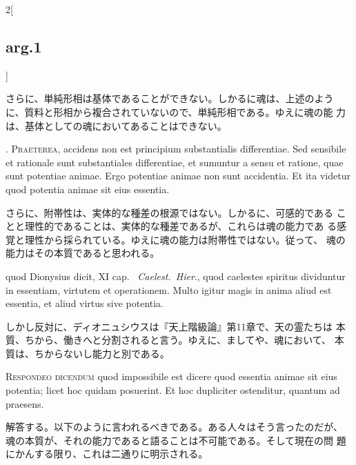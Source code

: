 \documentclass[paper=a4paper,fontsize=10pt,jafontsize=9pt,titlepage]{jlreq}
\begin{document}
\begin{paracol}{2}[\subsection{arg.1}]
\switchcolumn

 さらに、単純形相は基体であることができない。しかるに魂は、上述のよう
 に、質料と形相から複合されていないので、単純形相である。ゆえに魂の能
 力は、基体としての魂においてあることはできない。


. {\scshape Praeterea}, accidens non est principium substantialis
differentiae. Sed sensibile et rationale sunt substantiales
differentiae, et sumuntur a sensu et ratione, quae sunt potentiae
animae. Ergo potentiae animae non sunt accidentia. Et ita videtur quod
potentia animae sit eius essentia.

\switchcolumn

 さらに、附帯性は、実体的な種差の根源ではない。しかるに、可感的である
 ことと理性的であることは、実体的な種差であるが、これらは魂の能力であ
 る感覚と理性から採られている。ゆえに魂の能力は附帯性ではない。従って、
 魂の能力はその本質であると思われる。


 quod Dionysius dicit, XI cap.~{\itshape
Caelest.~Hier}., quod caelestes spiritus dividuntur in essentiam,
virtutem et operationem. Multo igitur magis in anima aliud est
essentia, et aliud virtus sive potentia.

\switchcolumn

 しかし反対に、ディオニュシウスは『天上階級論』第11章で、天の霊たちは
 本質、ちから、働きへと分割されると言う。ゆえに、ましてや、魂において、
 本質は、ちからないし能力と別である。



{\scshape Respondeo dicendum} quod impossibile est dicere quod
essentia animae sit eius potentia; licet hoc quidam posuerint. Et hoc
 dupliciter ostenditur, quantum ad praesens.

\switchcolumn

 解答する。以下のように言われるべきである。ある人々はそう言ったのだが、
 魂の本質が、それの能力であると語ることは不可能である。そして現在の問
 題にかんする限り、これは二通りに明示される。


\end{paracol}
\end{document}
